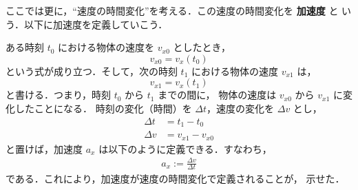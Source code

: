            ここでは更に，“速度の時間変化”を考える．この速度の時間変化を \textbf{加速度} と
            いう．以下に加速度を定義していこう．

            ある時刻 $t_{0}$ における物体の速度を $v_{x0}$ としたとき，
                \begin{equation*}
                    v_{x0} = v_{x}(t_{0})
                \end{equation*}
            という式が成り立つ．そして，次の時刻 $t_{1}$ における物体の速度 $v_{x1}$ は，
                \begin{equation*}
                    v_{x1} = v_{x}(t_{1})
                \end{equation*}
            と書ける．つまり，時刻 $t_{0}$ から $t_{1}$ までの間に，
            物体の速度は $v_{x0}$ から $v_{x1}$ に変化したことになる．
            時刻の変化（時間）を $\Delta t$，速度の変化を $\Delta v$ とし，
                \begin{align*}
                    \Delta t &= t_{1}  - t_{0}   \\
                    \Delta v &= v_{x1} - v_{x0}
                \end{align*}
            と置けば，加速度 $a_{x}$ は以下のように定義できる．すなわち，
                \begin{align}
                    a_{x} := \frac{\Delta v}{\Delta t}
                \end{align}
            である．これにより，加速度が速度の時間変化で定義されることが，
            示せた．

